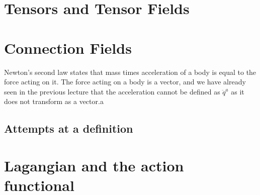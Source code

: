 \documentclass[a4 paper, 11pt]{book}
\theoremstyle{definition}
\newcommand{\pii}{\symup{\pi}}
\renewcommand{\i}{\symrm{i}}
\newcommand{\e}{\symrm{e}}
\begin{document}
    \chapter{Tensors and Tensor Fields}
    
    \chapter{Connection Fields}

    Newton's second law states that mass times acceleration of a body is equal to the force acting on it. The force acting on a body is a vector, and we have already seen in the previous lecture that the acceleration cannot be defined as \(\ddot q^a\) as it does not transform as a vector.a

    \section{Attempts at a definition}


    \chapter{Lagangian and the action functional}
    
     

    \nocite{*}
    \printbibliography[heading=bibintoc]
\end{document}
